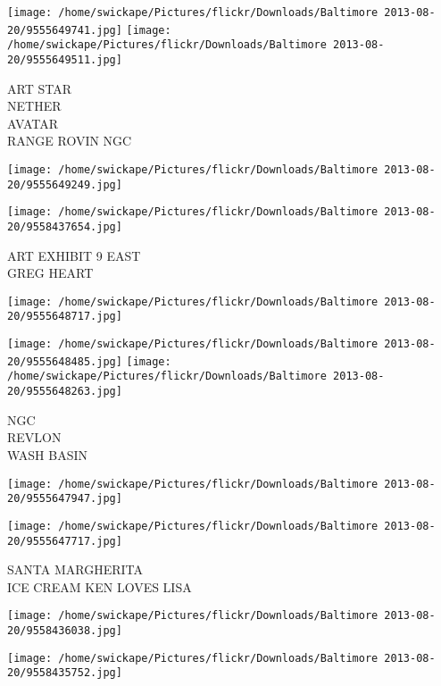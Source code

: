 \documentclass[10pt,letterpaper]{article}
\begin{document}
\texttt{[image: /home/swickape/Pictures/flickr/Downloads/Baltimore 2013-08-20/9555649741.jpg]}
\texttt{[image: /home/swickape/Pictures/flickr/Downloads/Baltimore 2013-08-20/9555649511.jpg]}

ART STAR\\
NETHER\\
AVATAR\\
RANGE ROVIN NGC\\
\pagebreak

\texttt{[image: /home/swickape/Pictures/flickr/Downloads/Baltimore 2013-08-20/9555649249.jpg]}

\vspace{0.25in}
\texttt{[image: /home/swickape/Pictures/flickr/Downloads/Baltimore 2013-08-20/9558437654.jpg]}

ART EXHIBIT 9 EAST\\
GREG HEART\\
\pagebreak

\texttt{[image: /home/swickape/Pictures/flickr/Downloads/Baltimore 2013-08-20/9555648717.jpg]}

\vspace{0.25in}
\texttt{[image: /home/swickape/Pictures/flickr/Downloads/Baltimore 2013-08-20/9555648485.jpg]}
\texttt{[image: /home/swickape/Pictures/flickr/Downloads/Baltimore 2013-08-20/9555648263.jpg]}

NGC\\
REVLON\\
WASH BASIN\\
\pagebreak

\texttt{[image: /home/swickape/Pictures/flickr/Downloads/Baltimore 2013-08-20/9555647947.jpg]}

\vspace{0.25in}
\texttt{[image: /home/swickape/Pictures/flickr/Downloads/Baltimore 2013-08-20/9555647717.jpg]}

SANTA MARGHERITA\\
ICE CREAM KEN LOVES LISA\\
\pagebreak

\texttt{[image: /home/swickape/Pictures/flickr/Downloads/Baltimore 2013-08-20/9558436038.jpg]}

\vspace{0.25in}
\texttt{[image: /home/swickape/Pictures/flickr/Downloads/Baltimore 2013-08-20/9558435752.jpg]}
\end{document}
